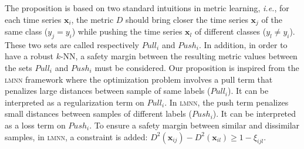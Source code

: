 The proposition is based on two standard intuitions in metric learning, \textit{i.e.}, for each time series $\textbf{x}_i$, the metric $D$ should bring closer the time series $\textbf{x}_j$ of the same class ($y_j=y_i$) while pushing the time series $\textbf{x}_l$ of different classes ($y_l \neq y_i$). These two sets are called respectively $Pull_i$ and $Push_i$. 
In addition, in order to have a robust $k$-NN, a safety margin between the resulting metric values between the sets $Pull_i$ and $Push_i$ must be considered. Our proposition is inspired from the \textsc{lmnn} framework where the optimization problem involves a pull term that penalizes large distances between sample of same labels ($Pull_i$). It can be interpreted as a regularization term on $Pull_i$. In \textsc{lmnn}, the push term penalizes small distances between samples of different labels ($Push_i$). It can be interpreted as a loss term on $Push_i$. To ensure a safety margin between similar and dissimilar samples, in \textsc{lmnn}, a constraint is added: $D^2(\textbf{x}_{ij})-D^2(\textbf{x}_{il}) \geq 1 - \xi_{ijl}$.

